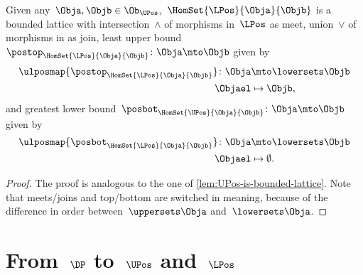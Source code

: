 \begin{lemma}
    \label{lem:LPos-is-bounded-lattice}
    Given any~$\Obja,\Objb\in \Ob_\UPos$,~$\HomSet{\LPos}{\Obja}{\Objb}$ is a bounded lattice with intersection~$\wedge$ of morphisms in~$\LPos$ as meet, union~$\vee$ of morphisms in \LPos as join, least upper bound~$\postop_{\HomSet{\LPos}{\Obja}{\Objb}}\colon \Obja \mto \Objb$ given by
    \begin{equation*}
        \begin{aligned}
            \ulposmap{\postop_{\HomSet{\LPos}{\Obja}{\Objb}}}\colon \Obja & \mto \lowersets \Objb \\
            \Objael                                                       & \mapsto \Objb,
        \end{aligned}
    \end{equation*}
    and greatest lower bound~$\posbot_{\HomSet{\UPos}{\Obja}{\Objb}}\colon \Obja \mto \Objb$ given by
    \begin{equation*}
        \begin{aligned}
            \ulposmap{\posbot_{\HomSet{\LPos}{\Obja}{\Objb}}}\colon \Obja & \mto \lowersets \Objb \\
            \Objael                                                       & \mapsto \emptyset.
        \end{aligned}
    \end{equation*}
\end{lemma}
\begin{proof}
    The proof is analogous to the one of \cref{lem:UPos-is-bounded-lattice}.
    Note that meets/joins and top/bottom are switched in meaning, because of the difference in order between~$\uppersets \Obja$ and~$\lowersets \Obja$.
\end{proof}

\section{From~$\DP$ to~$\UPos$ and~$\LPos$}

